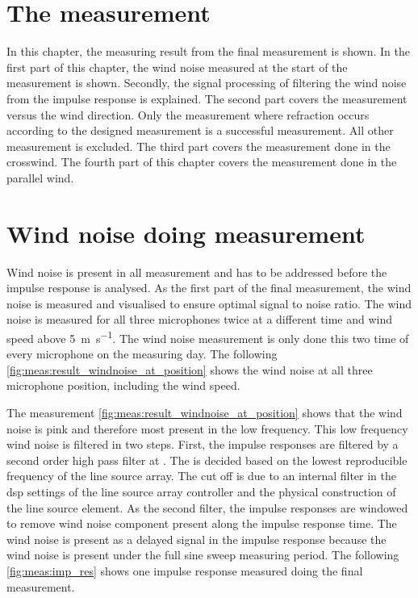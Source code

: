 \section{The measurement}\label{meas:meas_of_kudo}
In this chapter, the measuring result from the final measurement is shown. In the first part of this chapter, the wind noise measured at the start of the measurement is shown. Secondly, the signal processing of filtering the wind noise from the impulse response is explained. The second part covers the measurement versus the wind direction. Only the measurement where refraction occurs according to the designed measurement is a successful measurement. All other measurement is excluded. The third part covers the measurement done in the crosswind. The fourth part of this chapter covers the measurement done in the parallel wind. 


\section{Wind noise doing measurement}\label{mes:kudo:wind_noise}
Wind noise is present in all measurement and has to be addressed before the impulse response is analysed. As the first part of the final measurement, the wind noise is measured and visualised to ensure optimal signal to noise ratio. The wind noise is measured for all three microphones twice at a different time and wind speed above \SI{5}{\meter\per\second}. The wind noise measurement is only done this two time of every microphone on the measuring day. The following \autoref{fig:meas:result_windnoise_at_position} shows the wind noise at all three microphone position, including the wind speed.



The measurement \autoref{fig:meas:result_windnoise_at_position} shows that the wind noise is pink and therefore most present in the low frequency. This low frequency wind noise is filtered in two steps. First, the impulse responses are filtered by a second order high pass filter at .  The  is decided based on the lowest reproducible frequency of the line source array. The cut off is due to an internal filter in the \gls{dsp} settings of the line source array controller and the physical construction of the line source element. As the second filter, the impulse responses are windowed to remove wind noise component present along the impulse response time. The wind noise is present as a delayed signal in the impulse response because the wind noise is present under the full sine sweep measuring period. The following \autoref{fig:meas:imp_res} shows one impulse response measured doing the final measurement.

